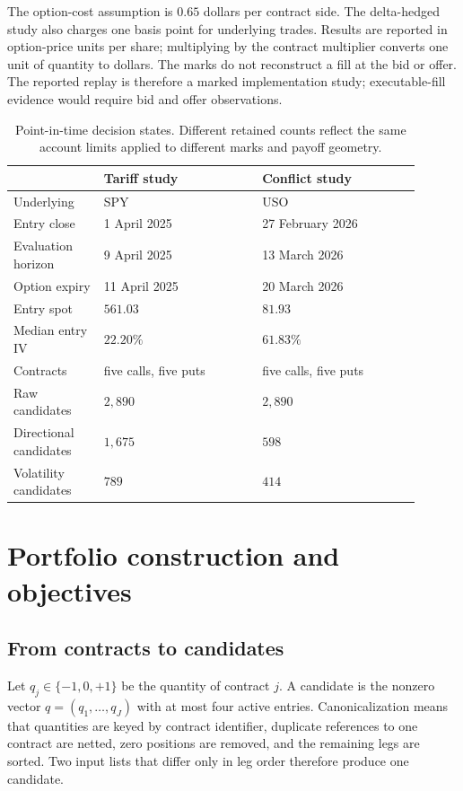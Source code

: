 \documentclass{strategynet-journal}
\begin{document}
The option-cost assumption is \(0.65\) dollars per contract side.  The
delta-hedged study also charges one basis point for underlying trades.
Results are reported in option-price units per share; multiplying by the
contract multiplier converts one unit of quantity to dollars.  The marks do
not reconstruct a fill at the bid or offer.  The reported replay is therefore
a marked implementation study; executable-fill evidence would require bid and
offer observations.

\begin{table}[H]
\centering
\small
\begin{tabular}{@{}p{0.20\linewidth}p{0.35\linewidth}p{0.35\linewidth}@{}}
\toprule
 & Tariff study & Conflict study \\
\midrule
Underlying & SPY & USO \\
Entry close & 1 April 2025 & 27 February 2026 \\
Evaluation horizon & 9 April 2025 & 13 March 2026 \\
Option expiry & 11 April 2025 & 20 March 2026 \\
Entry spot & \(561.03\) & \(81.93\) \\
Median entry IV & \(22.20\%\) & \(61.83\%\) \\
Contracts & five calls, five puts & five calls, five puts \\
Raw candidates & \(2{,}890\) & \(2{,}890\) \\
Directional candidates & \(1{,}675\) & \(598\) \\
Volatility candidates & \(789\) & \(414\) \\
\bottomrule
\end{tabular}
\caption{Point-in-time decision states.  Different retained counts reflect
the same account limits applied to different marks and payoff geometry.}
\label{tab:decision-states}
\end{table}

\section{Portfolio construction and objectives}

\subsection{From contracts to candidates}

Let \(q_j\in\{-1,0,+1\}\) be the quantity of contract \(j\).  A candidate is
the nonzero vector \(q=(q_1,\ldots,q_J)\) with at most four active entries.
Canonicalization means that quantities are keyed by contract identifier,
duplicate references to one contract are netted, zero positions are removed,
and the remaining legs are sorted.  Two input lists that differ only in leg
order therefore produce one candidate.
\end{document}
